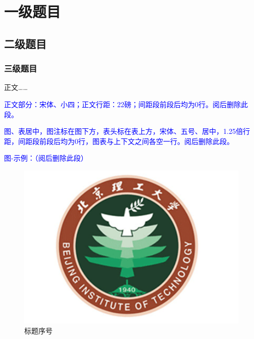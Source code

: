 %
%
%
%
%
%

\chapter{一级题目}

\section{二级题目}

\subsection{三级题目}

正文……

\textcolor{blue}{正文部分：宋体、小四；正文行距：22磅；间距段前段后均为0行。阅后删除此段。}

\textcolor{blue}{图、表居中，图注标在图下方，表头标在表上方，宋体、五号、居中，1.25倍行距，间距段前段后均为0行，图表与上下文之间各空一行。阅后删除此段。}

\textcolor{blue}{图-示例：（阅后删除此段）}

\begin{figure}[htbp]
  \vspace{11pt}  %
  \centering
  \includegraphics[]{images/bit_logo.png}
  \caption{标题序号}\label{标题序号} %
\end{figure}

